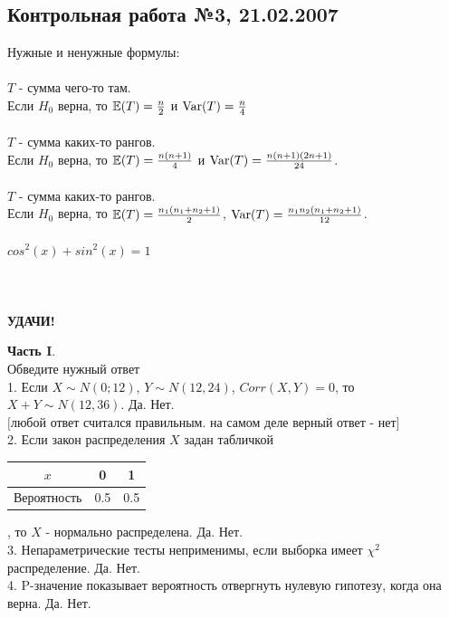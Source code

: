 \documentclass[12pt, a4paper]{article}\usepackage[]{graphicx}\usepackage[]{color}
\begin{document}
\subsection{Контрольная работа №3, 21.02.2007}

Нужные и ненужные формулы: \\ \\
$T$ - сумма чего-то там. \\
Если $H_{0}$ верна, то $\mathbb{E}(T)=\frac{n}{2}$ и $\operatorname{Var}(T)=\frac{n}{4}$ \\ \\
$T$ - сумма каких-то рангов. \\
Если $H_{0}$ верна, то $\mathbb{E}(T)=\frac{n(n+1)}{4}$ и
$\operatorname{Var}(T)=\frac{n(n+1)(2n+1)}{24}$. \\ \\
$T$ - сумма каких-то рангов. \\
Если $H_{0}$ верна, то $\mathbb{E}(T)=\frac{n_{1}(n_{1}+n_{2}+1)}{2}$,
$\operatorname{Var}(T)=\frac{n_{1}n_{2}(n_{1}+n_{2}+1)}{12}$. \\ \\
$cos^{2}(x)+sin^{2}(x)=1$ \\ \\ \\ \\


\textbf{УДАЧИ!}

\textbf{Часть I}. \\
Обведите нужный ответ \\

1. Если $X\sim N(0;12)$, $Y\sim N(12,24)$, $Corr(X,Y)=0$, то
$X+Y\sim N(12,36)$.
Да. Нет. \\
$[$любой ответ считался правильным. на самом деле верный ответ -
нет$]$ \\

2. Если закон распределения $X$ задан табличкой

\begin{tabular}{|c|c|c|}
  \hline
  $x$ & 0 & 1 \\
  \hline
  Вероятность & 0.5 & 0.5 \\
  \hline
\end{tabular}, то $X$ - нормально распределена. Да. Нет. \\

3. Непараметрические тесты неприменимы, если выборка имеет
$\chi^{2}$ распределение. Да. Нет.
\\

4. P-значение показывает вероятность отвергнуть нулевую
гипотезу, когда она верна. Да. Нет. \\
\end{document}
